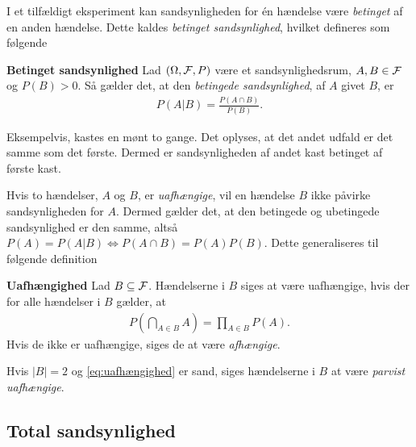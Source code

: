 I et tilfældigt eksperiment kan sandsynligheden for én hændelse være \textit{betinget} af en anden hændelse. Dette kaldes \textit{betinget sandsynlighed}, hvilket defineres som følgende

\begin{minipage}\textwidth
\begin{defn}\textbf{Betinget sandsynlighed} \label{def:betinget_sandsynlighed}%
\newline
Lad $(\Omega, \mathcal{F}, P)$ være et sandsynlighedsrum, $A,B\in \mathcal{F}$ og $P(B)>0$. Så gælder det, at den \textit{betingede sandsynlighed}, af $A$ givet $B$, er
\begin{align*}
      \displaystyle P(A|B)=\frac{P(A\cap B)}{P(B)}.
\end{align*}
\end{defn}
\end{minipage}

Eksempelvis, kastes en mønt to gange. Det oplyses, at det andet udfald er det samme som det første. Dermed er sandsynligheden af andet kast betinget af første kast.

Hvis to hændelser, $A$ og $B$, er \textit{uafhængige}, vil en hændelse $B$ ikke påvirke sandsynligheden for $A$. Dermed gælder det, at den betingede og ubetingede sandsynlighed er den samme, altså $P(A)=P(A|B)\Leftrightarrow P(A\cap B)=P(A)P(B)$. Dette generaliseres til følgende definition

\begin{minipage}\textwidth
\begin{defn}\textbf{Uafhængighed} %
\newline
Lad $B\subseteq \mathcal{F}$. Hændelserne i $B$ siges at være uafhængige, hvis der for alle hændelser i $B$ gælder, at
\begin{align}\label{eq:uafhængighed}
    P\left(\bigcap_{A\in B} A\right)=\prod_{A\in B} P(A).
\end{align}
Hvis de ikke er uafhængige, siges de at være \textit{afhængige}.
\end{defn}
\end{minipage}

Hvis $|B|=2$ og \eqref{eq:uafhængighed} er sand, siges hændelserne i $B$ at være \textit{parvist uafhængige}.

\subsection{Total sandsynlighed}

